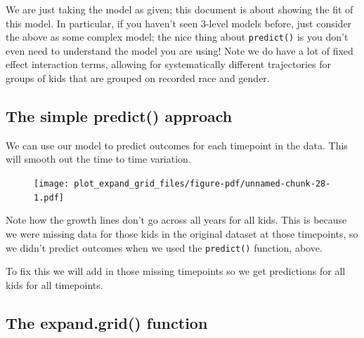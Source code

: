 \documentclass[
  letterpaper,
  DIV=11,
  numbers=noendperiod]{scrreprt}
\newenvironment{Shaded}{\begin{snugshade}}{\end{snugshade}}
\newcommand{\AttributeTok}[1]{\textcolor[rgb]{0.49,0.56,0.16}{#1}}
\newcommand{\FloatTok}[1]{\textcolor[rgb]{0.25,0.63,0.44}{#1}}
\newcommand{\FunctionTok}[1]{\textcolor[rgb]{0.02,0.16,0.49}{#1}}
\newcommand{\NormalTok}[1]{\textcolor[rgb]{0.00,0.44,0.13}{#1}}
\newcommand{\OtherTok}[1]{\textcolor[rgb]{0.00,0.44,0.13}{#1}}
\newcommand{\SpecialCharTok}[1]{\textcolor[rgb]{0.25,0.44,0.63}{#1}}
\begin{document}
We are just taking the model as given; this document is about showing
the fit of this model. In particular, if you haven't seen 3-level models
before, just consider the above as some complex model; the nice thing
about \texttt{predict()} is you don't even need to understand the model
you are using! Note we do have a lot of fixed effect interaction terms,
allowing for systematically different trajectories for groups of kids
that are grouped on recorded race and gender.

\hypertarget{the-simple-predict-approach}{%
\subsection{The simple predict()
approach}\label{the-simple-predict-approach}}

We can use our model to predict outcomes for each timepoint in the data.
This will smooth out the time to time variation.

\begin{Shaded}
\end{Shaded}

\begin{figure}[H]

{\centering \texttt{[image: plot\_expand\_grid\_files/figure-pdf/unnamed-chunk-28-1.pdf]}

}

\end{figure}

Note how the growth lines don't go across all years for all kids. This
is because we were missing data for those kids in the original dataset
at those timepoints, so we didn't predict outcomes when we used the
\texttt{predict()} function, above.

To fix this we will add in those missing timepoints so we get
predictions for all kids for all timepoints.

\hypertarget{the-expand.grid-function}{%
\subsection{The expand.grid() function}\label{the-expand.grid-function}}
\end{document}

